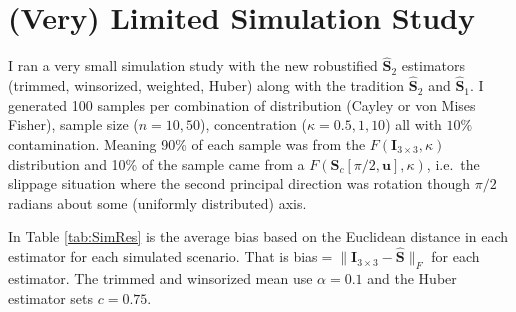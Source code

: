 \documentclass{article}\usepackage[]{graphicx}\usepackage[]{color}
\newenvironment{knitrout}{}{} %
\newcommand{\ProjMean}{{\widehat{\bm S}_{2}}}
\newcommand{\ProjMedian}{{\widehat{\bm S}_{1}}}
\begin{document}
% 

\begin{knitrout}
\color{fgcolor}











{\centering {}

}



\end{knitrout}









\section{(Very) Limited Simulation Study}

I ran a very small simulation study with the new robustified $\ProjMean$ estimators (trimmed, winsorized, weighted, Huber) along with the tradition $\ProjMean$ and $\ProjMedian$.  I generated 100 samples per combination of distribution (Cayley or von Mises Fisher), sample size ($n=10,50$), concentration ($\kappa=0.5,1,10$) all with $10\%$ contamination.  Meaning 90\% of each sample was from the $F(\bm I_{3\times 3},\kappa)$ distribution and 10\% of the sample came from a $F(\bm S_c[\pi/2,\bm u],\kappa)$, i.e.~the slippage situation where the second principal direction was rotation though $\pi/2$ radians about some (uniformly distributed) axis.

In Table \ref{tab:SimRes} is the average bias based on the Euclidean distance in each estimator for each simulated scenario.  That is bias$=\|\bm I_{3\times 3}-\widehat{\bm S}\|_F$ for each estimator.  The trimmed and winsorized mean use $\alpha=0.1$ and the Huber estimator sets $c=0.75$.
\end{document}
